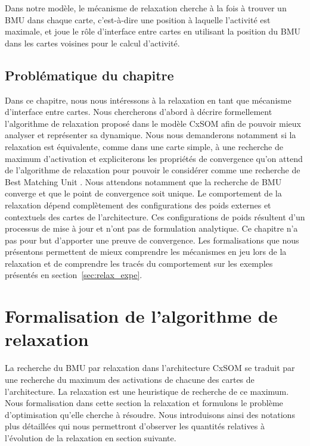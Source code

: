 \documentclass[../main]{subfiles}
\begin{document}
Dans notre modèle, le mécanisme de relaxation cherche à la fois à trouver un BMU dans chaque carte, c'est-à-dire une position à laquelle l'activité est maximale, et joue le rôle d'interface entre cartes en utilisant la position du BMU dans les cartes voisines pour le calcul d'activité. 

\subsection{Problématique du chapitre}

Dans ce chapitre, nous nous intéressons à la relaxation en tant que mécanisme d'interface entre cartes.
Nous chercherons d'abord à décrire formellement l'algorithme de relaxation proposé dans le modèle CxSOM afin de pouvoir mieux analyser et représenter sa dynamique. 
Nous nous demanderons notamment si la relaxation est équivalente, comme dans une carte simple, à une recherche de maximum d'activation et expliciterons les propriétés de convergence qu'on attend de l'algorithme de relaxation pour pouvoir le considérer comme une recherche de \og Best Matching Unit \fg{}. Nous attendons notamment que la recherche de BMU converge et que le point de convergence soit unique.
Le comportement de la relaxation dépend complètement des configurations des poids externes et contextuels des cartes de l'architecture. Ces configurations de poids résultent d'un processus de mise à jour et n'ont pas de formulation analytique. Ce chapitre n'a pas pour but d'apporter une preuve de convergence. 
Les formalisations que nous présentons permettent de mieux comprendre les mécanismes en jeu lors de la relaxation et de comprendre les tracés du comportement sur les exemples présentés en section~\ref{sec:relax_expe}.

\section{Formalisation de l'algorithme de relaxation}

La recherche du BMU par relaxation dans l'architecture CxSOM se traduit par une recherche du maximum des activations de chacune des cartes de l'architecture.
La relaxation est une heuristique de recherche de ce maximum.
Nous formalisation dans cette section la relaxation et formulons le problème d'optimisation qu'elle cherche à résoudre. 
Nous introduisons ainsi des notations plus détaillées qui nous permettront d'observer les quantités relatives à l'évolution de la relaxation en section suivante.
\end{document}
